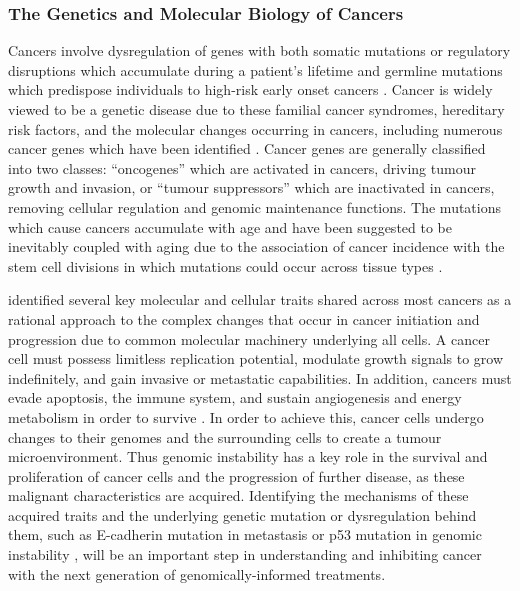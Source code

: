 

\subsubsection{The Genetics and Molecular Biology of Cancers}

Cancers involve dysregulation of genes with both somatic mutations or regulatory disruptions which accumulate during a patient's lifetime and germline mutations which predispose individuals to high-risk early onset cancers \citep{NCI2015, ACS2017, Guilford1998}. Cancer is widely viewed to be a genetic disease due to these familial cancer syndromes, hereditary risk factors, and the molecular changes occurring in cancers, including numerous cancer genes which have been identified \citet{Stratton2009, Vogelstein2013}. Cancer genes are generally classified into two classes: ``oncogenes'' which are activated in cancers, driving tumour growth and invasion, or ``tumour suppressors'' which are inactivated in cancers, removing cellular regulation and genomic maintenance functions. The mutations which cause cancers accumulate with age and have been suggested to be inevitably coupled with aging due to the association of cancer incidence with the stem cell divisions in which mutations could occur across tissue types \citep{Tomasetti2015}.  


\citet{Hanahan2000} identified several key molecular and cellular traits shared across most cancers as a rational approach to the complex changes that occur in cancer initiation and progression due to common molecular machinery underlying all cells. A cancer cell must possess limitless replication potential, modulate growth signals to grow indefinitely, and gain invasive or metastatic capabilities. In addition, cancers must evade apoptosis, the immune system, and sustain angiogenesis and energy metabolism in order to survive \citep{Hanahan2011, Hanahan2000}. In order to achieve this, cancer cells undergo changes to their genomes and the surrounding cells to create a tumour microenvironment. Thus genomic instability has a key role in the survival and proliferation of cancer cells and the progression of further disease, as these malignant characteristics are acquired. Identifying the mechanisms of these acquired traits and the underlying genetic mutation or dysregulation behind them, such as \gls{E-cadherin} mutation in metastasis or p53 mutation in genomic instability \citep{Hanahan2000}, will be an important step in understanding and inhibiting cancer with the next generation of genomically-informed treatments. 

